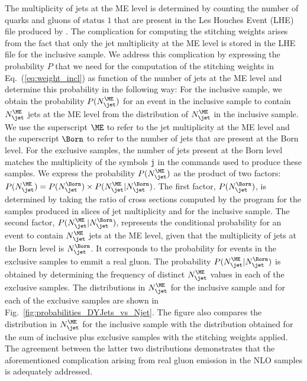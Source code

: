 The multiplicity of jets at the ME level is determined by counting the number of quarks and gluons of status $1$ 
that are present in the \textrm{Les Houches Event} (LHE)~\cite{Alwall:2006yp} file produced by \MGvATNLO.
The complication for computing the stitching weights arises from the fact that only the jet multiplicity at the ME level is stored in the LHE file for the inclusive sample.
We address this complication by expressing the probability $P$ that we need for the computation of the stitching weights in Eq.~(\ref{eq:weight_incl})
as function of the number of jets at the ME level and determine this probability in the following way:
For the inclusive sample, we obtain the probability $P(N_{\jet}^{\ME})$ for an event in the inclusive sample
to contain $N_{\jet}^{\ME}$ jets at the ME level 
from the distribution of $N_{\jet}^{\ME}$ in the inclusive sample.
We use the superscript $\ME$ to refer to the jet multiplicity at the ME level
and the superscript $\Born$ to refer to the number of jets that are present at the Born level.
For the exclusive samples, the number of jets present at the Born level matches the multiplicity of the symbols \texttt{j} in the \MGvATNLO commands
used to produce these samples.
We express the probability $P(N_{\jet}^{\ME})$ as the product of two factors: $P(N_{\jet}^{\ME}) = P(N_{\jet}^{\Born}) \times P(N_{\jet}^{\ME} \vert N_{\jet}^{\Born})$.
The first factor, $P(N_{\jet}^{\Born})$, is determined by taking the ratio of cross sections computed by the program \MGvATNLO 
for the samples produced in slices of jet multiplicity and for the inclusive sample.
The second factor, $P(N_{\jet}^{\ME} \vert N_{\jet}^{\Born})$, represents the conditional probability for an event to contain $N_{\jet}^{\ME}$ jets at the ME level,
given that the multiplicity of jets at the Born level is $N_{\jet}^{\Born}$.
It corresponds to the probability for events in the exclusive samples to emmit a real gluon.
The probability $P(N_{\jet}^{\ME} \vert N_{\jet}^{\Born})$ is obtained by determining the frequency of distinct $N_{\jet}^{\ME}$ values 
in each of the exclusive samples.
The distributions in $N_{\jet}^{\ME}$ for the inclusive sample and for each of the exclusive samples
are shown in Fig.~\ref{fig:probabilities_DYJets_vs_Njet}.
The figure also compares the distribution in $N_{\jet}^{\ME}$ for the inclusive sample
with the distribution obtained for the sum of inclusive plus exclusive samples with the stitching weights applied.
The agreement between the latter two distributions demonstrates that the aforementioned complication arising from real gluon emission in the NLO samples
is adequately addressed.

